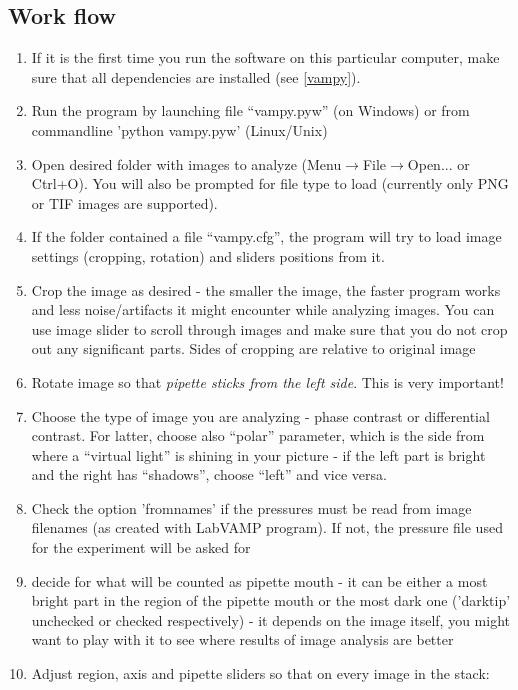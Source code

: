 \subsection{Work flow}\label{vampy-work}
\begin{enumerate}
	\item If it is the first time you run the software on this particular computer, make sure that all dependencies are installed (see \ref{vampy}).
	\item Run the program by launching file ``vampy.pyw'' (on Windows) or from commandline 'python vampy.pyw' (Linux/Unix)
	\item Open desired folder with images to analyze (Menu$\rightarrow$File$\rightarrow$Open... or Ctrl+O). You will also be prompted for file type to load (currently only PNG or TIF images are supported).
	\item If the folder contained a file ``vampy.cfg'', the program will try to load image settings (cropping, rotation) and sliders positions from it.
	\item Crop the image as desired - the smaller the image, the faster program works and less noise/artifacts it might encounter while analyzing images. You can use image slider to scroll through images and make sure that you do not crop out any significant parts. Sides of cropping are relative to original image
	\item Rotate image so that \emph{pipette sticks from the left side}. This is very important!
	\item Choose the type of image you are analyzing - phase contrast or differential contrast. For latter, choose also ``polar'' parameter, which is the side from where a ``virtual light'' is shining in your picture - if the left part is bright and the right has ``shadows'', choose ``left'' and vice versa.
	\item Check the option 'fromnames' if the pressures must be read from image filenames (as created with LabVAMP program). If not, the pressure file used for the experiment will be asked for
	\item decide for what will be counted as pipette mouth - it can be either a most bright part in the region of the pipette mouth or the most dark one ('darktip' unchecked or checked respectively) - it depends on the image itself, you might want to play with it to see where results of image analysis are better
	\item Adjust region, axis and pipette sliders so that on every image in the stack:
	\begin{itemize}

\end{itemize}
\end{enumerate}
